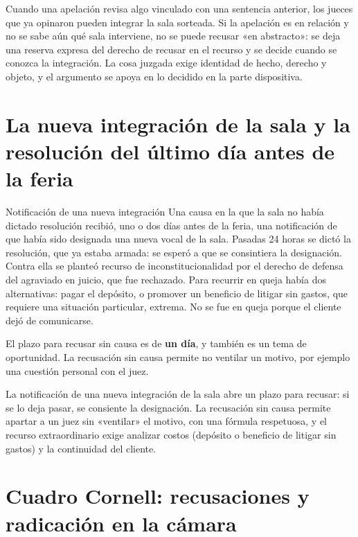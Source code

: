 \documentclass[12pt,oneside]{book}
\begin{document}
\begin{important}
Cuando una apelación revisa algo vinculado con una sentencia anterior, los jueces que ya opinaron pueden integrar la sala sorteada. Si la apelación es en relación y no se sabe aún qué sala interviene, no se puede recusar «en abstracto»: se deja una reserva expresa del derecho de recusar en el recurso y se decide cuando se conozca la integración. La cosa juzgada exige identidad de hecho, derecho y objeto, y el argumento se apoya en lo decidido en la parte dispositiva.
\end{important}

\section{La nueva integración de la sala y la resolución del último día antes de la feria}

\begin{example}{Notificación de una nueva integración}
Una causa en la que la sala no había dictado resolución recibió, uno o dos días antes de la feria, una notificación de que había sido designada una nueva vocal de la sala. Pasadas 24 horas se dictó la resolución, que ya estaba armada: se esperó a que se consintiera la designación. Contra ella se planteó recurso de inconstitucionalidad por el derecho de defensa del agraviado en juicio, que fue rechazado. Para recurrir en queja había dos alternativas: pagar el depósito, o promover un beneficio de litigar sin gastos, que requiere una situación particular, extrema. No se fue en queja porque el cliente dejó de comunicarse.
\end{example}

El plazo para recusar sin causa es de \textbf{un día}, y también es un tema de oportunidad. La recusación sin causa permite no ventilar un motivo, por ejemplo una cuestión personal con el juez.

\begin{important}
La notificación de una nueva integración de la sala abre un plazo para recusar: si se lo deja pasar, se consiente la designación. La recusación sin causa permite apartar a un juez sin «ventilar» el motivo, con una fórmula respetuosa, y el recurso extraordinario exige analizar costos (depósito o beneficio de litigar sin gastos) y la continuidad del cliente.
\end{important}

\section*{Cuadro Cornell: recusaciones y radicación en la cámara}
\end{document}
